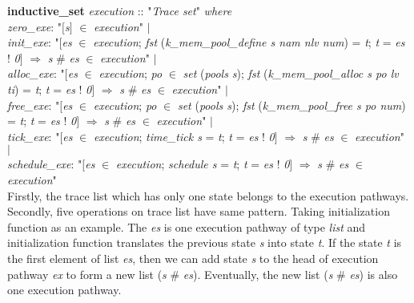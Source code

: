 \documentclass[runningheads]{llncs}
\begin{document}
\phantom{x} \textbf{inductive\_set} \textsl{execution} :: "\textsl{Trace set}" \textsl{where} \\
\phantom{x} \hspace{3pt} \textsl{zero\_exe}: "$\lbrack$\textsl{s}$\rbrack$ $\in$ \textsl{execution}" $\mid$ \\
\phantom{x} \hspace{3pt} \textsl{init\_exe}: "$\lbrack$\textsl{es} $\in$ \textsl{execution}; \textsl{fst} (\textsl{k\_mem\_pool\_define s nam nlv num}) = \textsl{t}; \textsl{t} = \textsl{es} ! \textsl{0}$\rbrack$ $\Longrightarrow$ \textsl{s} \# \textsl{es} $\in$ \textsl{execution}" $\mid$ \\
\phantom{x} \hspace{3pt} \textsl{alloc\_exe}: "$\lbrack$\textsl{es} $\in$ \textsl{execution}; \textsl{po} $\in$ \textsl{set} (\textsl{pools s}); \textsl{fst} (\textsl{k\_mem\_pool\_alloc s po lv ti}) = \textsl{t}; \textsl{t} = \textsl{es} ! \textsl{0}$\rbrack$ $\Longrightarrow$ \textsl{s} \# \textsl{es} $\in$ \textsl{execution}" $\mid$ \\
\phantom{x} \hspace{3pt} \textsl{free\_exe}: "$\lbrack$\textsl{es} $\in$ \textsl{execution}; \textsl{po} $\in$ \textsl{set} (\textsl{pools s}); \textsl{fst} (\textsl{k\_mem\_pool\_free s po num}) = \textsl{t}; \textsl{t} = \textsl{es} ! \textsl{0}$\rbrack$ $\Longrightarrow$ \textsl{s} \# \textsl{es} $\in$ \textsl{execution}" $\mid$ \\
\phantom{x} \hspace{3pt} \textsl{tick\_exe}: "$\lbrack$\textsl{es} $\in$ \textsl{execution}; \textsl{time\_tick s} = \textsl{t}; \textsl{t} = \textsl{es} ! \textsl{0}$\rbrack$ $\Longrightarrow$ \textsl{s} \# \textsl{es} $\in$ \textsl{execution}" $\mid$ \\
\phantom{x} \hspace{3pt} \textsl{schedule\_exe}: "$\lbrack$\textsl{es} $\in$ \textsl{execution}; \textsl{schedule s} = \textsl{t}; \textsl{t} = \textsl{es} ! \textsl{0}$\rbrack$ $\Longrightarrow$ \textsl{s} \# \textsl{es} $\in$ \textsl{execution}" \\

Firstly, the trace list which has only one state belongs to the execution pathways. Secondly, five operations on trace list have same pattern. Taking initialization function as an example. The \textsl{es} is one execution pathway of type \textsl{list} and initialization function translates the previous state \textsl{s} into state \textsl{t}. If the state \textsl{t} is the first element of list \textsl{es}, then we can add state \textsl{s} to the head of execution pathway \textsl{ex} to form a new list (\textsl{s} \# \textsl{es}). Eventually, the new list (\textsl{s} \# \textsl{es}) is also one execution pathway.
\end{document}
